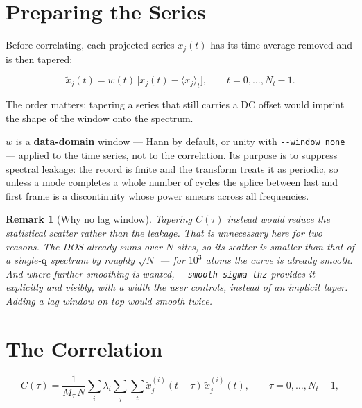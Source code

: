 \documentclass[12pt, a4paper, oneside]{article}
\newtheorem{remark}[theorem]{Remark}
\newcommand{\qvec}{\mathbf{q}}
\newcommand{\Nt}{N_t}
\newcommand{\Na}{N}
\begin{document}
\section{Preparing the Series}

Before correlating, each projected series $x_j(t)$ has its time average removed
and is then tapered:

\begin{equation}
    \tilde x_j(t) = w(t)\,\bigl[x_j(t) - \langle x_j\rangle_t\bigr],
    \qquad t = 0,\dots,\Nt-1 .
\end{equation}

The order matters: tapering a series that still carries a DC offset would
imprint the shape of the window onto the spectrum.

$w$ is a \textbf{data-domain} window --- Hann by default, or unity with
\texttt{-\/-window none} --- applied to the time series, not to the
correlation. Its purpose is to suppress spectral leakage: the record is finite
and the transform treats it as periodic, so unless a mode completes a whole
number of cycles the splice between last and first frame is a discontinuity
whose power smears across all frequencies.

\begin{remark}[Why no lag window]
Tapering $C(\tau)$ instead would reduce the statistical scatter rather than the
leakage. That is unnecessary here for two reasons. The DOS already sums over
$\Na$ sites, so its scatter is smaller than that of a single-$\qvec$ spectrum
by roughly $\sqrt{\Na}$ --- for $10^3$ atoms the curve is already smooth. And
where further smoothing is wanted, \texttt{-\/-smooth-sigma-thz} provides it
explicitly and visibly, with a width the user controls, instead of an implicit
taper. Adding a lag window on top would smooth twice.
\end{remark}

\section{The Correlation}

\begin{equation}
\boxed{
    C(\tau) = \frac{1}{M_\tau\,\Na}\sum_i \lambda_i
              \sum_j \sum_t \tilde x_j^{(i)}(t{+}\tau)\,\tilde x_j^{(i)}(t),
    \qquad \tau = 0,\dots,\Nt-1,
}
\label{eq:corr}
\end{equation}
\end{document}
